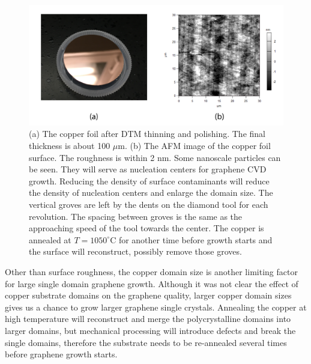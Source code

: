 \documentclass[pdflatex, sectionletters, 12pt]{pittetd}    %
\begin{document}
\begin{figure}[h!]
	\centering
	\includegraphics[width=1.0\textwidth]{Drawing/DTMCopper.pdf}
	\caption{(a) The copper foil after DTM thinning and polishing. The final thickness is about 100 $\mu$m. (b) The AFM image of the copper foil surface. The roughness is within 2 nm. Some nanoscale particles can be seen. They will serve as nucleation centers for graphene CVD growth. Reducing the density of surface contaminants will reduce the density of nucleation centers and enlarge the domain size. The vertical groves are left by the dents on the diamond tool for each revolution. The spacing between groves is the same as the approaching speed of the tool towards the center. The copper is annealed at $T = 1050^{\circ}$C for another time before growth starts and the surface will reconstruct, possibly remove those groves.}
	\label{FIG:DTMFinishing}
\end{figure}

Other than surface roughness, the copper domain size is another limiting factor for large single domain graphene growth. Although it was not clear the effect of copper substrate domains on the graphene quality\cite{kim2012direct, wang2012controllable, wofford2010graphene}, larger copper domain sizes gives us a chance to grow larger graphene single crystals. Annealing the copper at high temperature will reconstruct and merge the polycrystalline domains into larger domains, but mechanical processing will introduce defects and break the single domains, therefore the substrate needs to be re-annealed several times before graphene growth starts.
\end{document}
